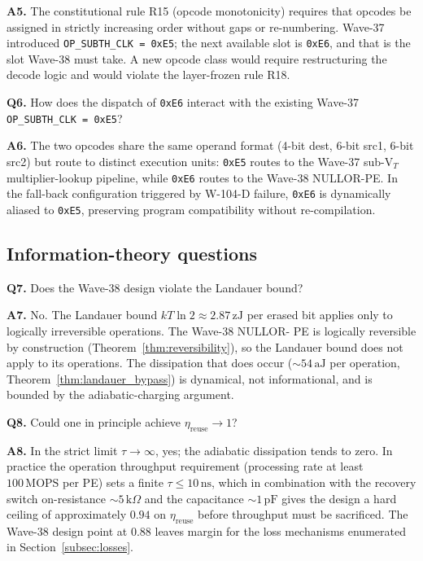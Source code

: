 \textbf{A5.}  The constitutional rule R15 (opcode monotonicity) requires that
opcodes be assigned in strictly increasing order without gaps or re-numbering.
Wave-37 introduced \texttt{OP\_SUBTH\_CLK = 0xE5}; the next available slot is
\texttt{0xE6}, and that is the slot Wave-38 must take.  A new opcode class would
require restructuring the decode logic and would violate the layer-frozen rule
R18.

\textbf{Q6.}  How does the dispatch of \texttt{0xE6} interact with the existing
Wave-37 \texttt{OP\_SUBTH\_CLK = 0xE5}?

\textbf{A6.}  The two opcodes share the same operand format (4-bit dest, 6-bit
src1, 6-bit src2) but route to distinct execution units: \texttt{0xE5} routes to
the Wave-37 sub-V$_T$ multiplier-lookup pipeline, while \texttt{0xE6} routes to
the Wave-38 NULLOR-PE.  In the fall-back configuration triggered by W-104-D
failure, \texttt{0xE6} is dynamically aliased to \texttt{0xE5}, preserving program
compatibility without re-compilation.

\subsection{Information-theory questions}
\label{subsec:info_q}

\textbf{Q7.}  Does the Wave-38 design violate the Landauer bound?

\textbf{A7.}  No.  The Landauer bound $kT \ln 2 \approx 2.87\,\text{zJ}$ per
erased bit applies only to logically irreversible operations.  The Wave-38 NULLOR-
PE is logically reversible by construction (Theorem~\ref{thm:reversibility}), so
the Landauer bound does not apply to its operations.  The dissipation that does
occur ($\sim 54\,\text{aJ}$ per operation, Theorem~\ref{thm:landauer_bypass}) is
dynamical, not informational, and is bounded by the adiabatic-charging argument.

\textbf{Q8.}  Could one in principle achieve $\eta_{\text{reuse}} \to 1$?

\textbf{A8.}  In the strict limit $\tau \to \infty$, yes; the adiabatic
dissipation tends to zero.  In practice the operation throughput requirement
(processing rate at least $100\,\text{MOPS}$ per PE) sets a finite $\tau \leq
10\,\text{ns}$, which in combination with the recovery switch on-resistance
$\sim 5\,\text{k}\Omega$ and the capacitance $\sim 1\,\text{pF}$ gives the design
a hard ceiling of approximately $0.94$ on $\eta_{\text{reuse}}$ before throughput
must be sacrificed.  The Wave-38 design point at $0.88$ leaves margin for the
loss mechanisms enumerated in Section~\ref{subsec:losses}.

